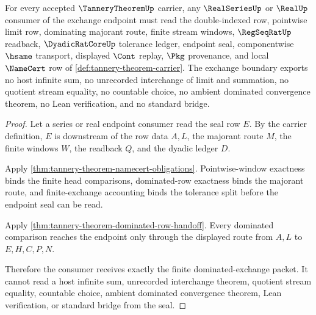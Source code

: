 \begin{theorem}
\label{thm:tannery-theorem-real-series-exchange-boundary}
For every accepted $\TanneryTheoremUp$ carrier, any $\RealSeriesUp$ or $\RealUp$ consumer of the exchange endpoint must read the double-indexed row, pointwise limit row, dominating majorant route, finite stream windows, $\RegSeqRatUp$ readback, $\DyadicRatCoreUp$ tolerance ledger, endpoint seal, componentwise $\hsame$ transport, displayed $\Cont$ replay, $\Pkg$ provenance, and local $\NameCert$ row of \autoref{def:tannery-theorem-carrier}. The exchange boundary exports no host infinite sum, no unrecorded interchange of limit and summation, no quotient stream equality, no countable choice, no ambient dominated convergence theorem, no Lean verification, and no standard bridge.
\end{theorem}
\begin{proof}
Let a series or real endpoint consumer read the seal row $E$. By the carrier definition, $E$ is downstream of the row data $A,L$, the majorant route $M$, the finite windows $W$, the readback $Q$, and the dyadic ledger $D$.

Apply \autoref{thm:tannery-theorem-namecert-obligations}. Pointwise-window exactness binds the finite head comparisons, dominated-row exactness binds the majorant route, and finite-exchange accounting binds the tolerance split before the endpoint seal can be read.

Apply \autoref{thm:tannery-theorem-dominated-row-handoff}. Every dominated comparison reaches the endpoint only through the displayed route from $A,L$ to $E,H,C,P,N$.

Therefore the consumer receives exactly the finite dominated-exchange packet. It cannot read a host infinite sum, unrecorded interchange theorem, quotient stream equality, countable choice, ambient dominated convergence theorem, Lean verification, or standard bridge from the seal.
\end{proof}



